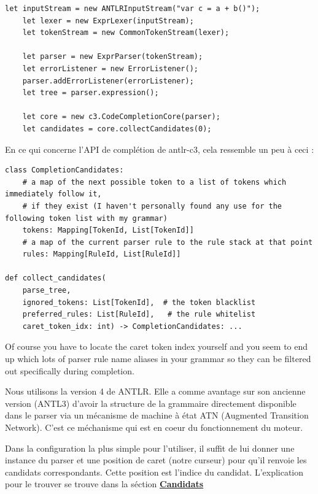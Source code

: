 \documentclass[
    iict, %
    il, %
]{heig-tb}
\begin{document}
\begin{lstlisting}[frame=single]
    let inputStream = new ANTLRInputStream("var c = a + b()");
    let lexer = new ExprLexer(inputStream);
    let tokenStream = new CommonTokenStream(lexer);

    let parser = new ExprParser(tokenStream);
    let errorListener = new ErrorListener();
    parser.addErrorListener(errorListener);
    let tree = parser.expression();

    let core = new c3.CodeCompletionCore(parser);
    let candidates = core.collectCandidates(0);
\end{lstlisting}

En ce qui concerne l'API de complétion de antlr-c3, cela ressemble un peu à ceci :

\begin{lstlisting}[frame=single]
class CompletionCandidates:
    # a map of the next possible token to a list of tokens which immediately follow it,
    # if they exist (I haven't personally found any use for the following token list with my grammar)
    tokens: Mapping[TokenId, List[TokenId]]
    # a map of the current parser rule to the rule stack at that point
    rules: Mapping[RuleId, List[RuleId]]

def collect_candidates(
    parse_tree,
    ignored_tokens: List[TokenId],  # the token blacklist
    preferred_rules: List[RuleId],   # the rule whitelist
    caret_token_idx: int) -> CompletionCandidates: ...
\end{lstlisting}



Of course you have to locate the caret token index yourself and you seem to end up which lots of parser rule name aliases in your grammar so they can be filtered out specifically during completion.


Nous utilisons la version 4 de ANTLR. Elle a comme avantage sur son ancienne version (ANTL3) d'avoir la structure de la grammaire directement disponible dans le parser via
un mécanisme de machine à état ATN (Augmented Transition Network). C'est ce méchanisme qui est en coeur du fonctionnement du moteur.

Dans la configuration la plus simple pour l'utiliser, il suffit de lui donner une instance du parser et une position de caret (notre curseur) pour qu'il renvoie les candidats correspondants.
Cette position est l'indice du candidat. L'explication pour le trouver se trouve dans la séction \hyperref[candidates]{\textbf{Candidats}}
\end{document}
